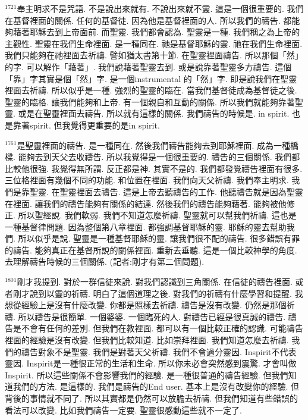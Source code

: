 \documentclass{book}
\begin{document}
$^{1721}$奉主明求不是咒語.
不是說出來就有.
不說出來就不靈.
這是一個很重要的.
我們在基督裡面的關係.
任何的基督徒.
因為他是基督裡面的人.
所以我們的禱告.
都能夠藉著耶穌去到上帝面前.
而聖靈.
我們都會認為.
聖靈是一種.
我們稱之為上帝的主觀性.
聖靈在我們生命裡面.
是一種同在.
祂是基督耶穌的靈.
祂在我們生命裡面.
我們只能夠在祂裡面去祈禱.
譬如猶太書第十節.
在聖靈裡面禱告.
所以那個「然」的字.
可以解作「藉著」.
我們說藉著聖靈去到.
或是說靠著聖靈多方禱告.
這個「靠」字其實是個「然」字.
是一個instrumental 的「然」字.
即是說我們在聖靈裡面去祈禱.
所以似乎是一種.
強烈的聖靈的臨在.
當我們基督徒成為基督徒之後.
聖靈的臨格.
讓我們能夠和上帝.
有一個親自和互動的關係.
所以我們就能夠靠著聖靈.
或是在聖靈裡面去禱告.
所以就有這樣的關係.
我們禱告的時候是.
in spirit.
也是靠著spirit.
但我覺得更重要的是in spirit.

$^{1761}$是聖靈裡面的禱告.
是一種同在.
然後我們禱告能夠去到耶穌裡面.
成為一種橋樑.
能夠去到天父去收禱告.
所以我覺得是一個很重要的.
禱告的三個關係.
我們都比較他很強.
我覺得無所謂.
反正都是神.
其實不是的.
我們都發覺禱告裡面有很多.
三位格裡面有幾個不同的功能.
和位置在裡面.
我們向天父祈禱.
我們奉主明求.
我們是靠聖靈.
在聖靈裡面去禱告.
這是上帝去聽禱告的工作.
他聽禱告就是因為聖靈在裡面.
讓我們的禱告能夠有關係的結達.
然後我們的禱告能夠藉著.
能夠被他修正.
所以聖經說.
我們軟弱.
我們不知道怎麼祈禱.
聖靈就可以幫我們祈禱.
這也是一種基督律問題.
因為整個第八章裡面.
都強調基督耶穌的靈.
耶穌的靈去幫助我們.
所以似乎是說.
聖靈是一種基督耶穌的靈.
讓我們很不配的禱告.
很多錯誤有罪的禱告.
能夠真正在基督所說的關係裡面.
重新去垂聽.
這是一個比較神學的角度.
去理解禱告時候的三個關係.
(記者:剛才有第二個問題).

$^{1801}$剛才我提到.
對於一群信徒來說.
對我們認識到三角關係.
在信徒的禱告裡面.
或者剛才說到以靈的祈禱.
明白了這個道理之後.
對我們的祈禱有什麼學習和提醒.
我想從經驗上是沒有什麼改變.
你都是照樣去祈禱.
禱告是沒有改變.
仍然是那個祈禱.
所以禱告是很簡單.
一個婆婆.
一個臨死的人.
對禱告已經是很真誠的禱告.
禱告是不會有任何的差別.
但我們在教裡面.
都可以有一個比較正確的認識.
可能禱告裡面的經驗是沒有改變.
但我們比較知道.
比如崇拜裡面.
我們知道怎麼去祈禱.
我們的禱告對象不是聖靈.
我們是對著天父祈禱.
我們不會過分靈因.
Inspirit不代表靈因.
Inspirit是一種很正常的生活和生命.
所以你未必會突然感到震驚.
才會叫做Inspirit.
所以這些關係不會影響我們的經驗.
是一種很普通的禱告經驗.
但我們知道我們的方法.
是這樣的.
我們是禱告的End user.
基本上是沒有改變你的經驗.
但背後的事情就不同了.
所以其實都是仍然可以放膽去祈禱.
但我們知道有些錯誤的看法可以改變.
比如我們禱告一定要.
聖靈很感動這些就不一定了.
\end{document}
